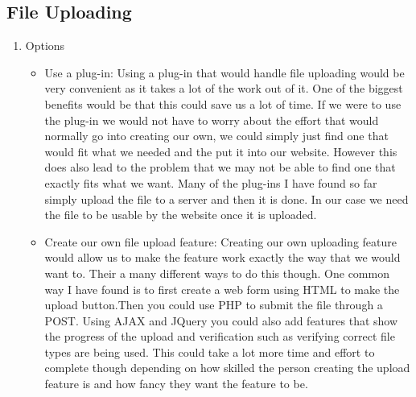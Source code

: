 \documentclass[letterpaper, 10pt, draftclsnofoot, compsoc, onecolumn]{IEEEtran}
\begin{document}
	\subsection{File Uploading}
		\begin{enumerate}
			\item{Options}
				\begin{itemize}
					\item  Use a plug-in: Using a plug-in that would handle file uploading would be very convenient as it takes a lot
						of the work out of it. One of the  biggest benefits would be that this could save us a lot of time. If we were to use
						the plug-in we would not have to worry about the effort that would normally go into creating our own, we could simply just
						find one that would fit  what we needed and the put it into our website. However this does also lead to the problem that we
						may not be able to find one that exactly fits what we want. Many of the plug-ins I have found so far simply upload the file to
						a server and then it is done. In our case we need the file to be usable by the website once it is uploaded.
 
					\item  Create our own file upload feature: Creating our own uploading feature would allow us to make the feature 
						work exactly the way that we would want to. Their a many different ways to do this though. One common way I have found 
						is to first create a web form using HTML to make the upload button.Then you could use PHP to submit the file through a POST.
						Using AJAX and JQuery you could also add features that show the progress of the upload and verification such as verifying correct 
						file types are being used. This could take a lot more time and effort to complete though depending on how skilled the person creating 
						the upload feature is and how fancy they want the feature to be.      


\end{itemize}
\end{enumerate}
\end{document}
